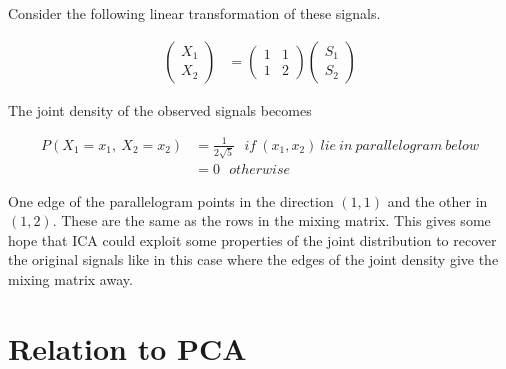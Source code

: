 \documentclass[11pt, a4paper]{article}
\begin{document}
Consider the following linear transformation of these signals.

\begin{align*}
	\begin{pmatrix} 
	X_1 \\ 
	X_2 
	\end{pmatrix} & = 
	\begin{pmatrix} 
	1             & 1 \\ 
	1             & 2 
	\end{pmatrix}
	\begin{pmatrix} 
	S_1 \\ 
	S_2
	\end{pmatrix}
\end{align*}

The joint density of the observed signals becomes

\begin{align*}
	P(X_1=x_1,\ X_2=x_2) & = \frac{1}{2\sqrt{5}}\ \ \ if\ (x_1, x_2)\ lie\ in\  parallelogram\ below \\
	                     & = 0\ \ \ otherwise                                                        
\end{align*}


\begin{figure}[htbp]
	\centering
\end{figure}

\FloatBarrier

One edge of the parallelogram points in the direction $(1, 1)$ and the other in $(1, 2)$. These are the same as the rows in the mixing matrix. This gives some hope that ICA could exploit some properties of the joint distribution to recover the original signals like in this case where the edges of the joint density give the mixing matrix away. 

\section{Relation to PCA}
\end{document}

